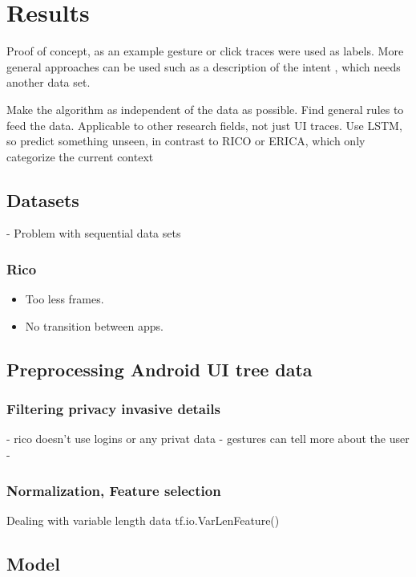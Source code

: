 \chapter{Results}

Proof of concept, as an example gesture or click traces were used as labels.
More general approaches can be used such as a description of the intent \cite{screen2words}, which needs another data set.

Make the algorithm as independent of the data as possible.
Find general rules to feed the data.
Applicable to other research fields, not just UI traces.
Use LSTM, so predict something unseen, in contrast to RICO or ERICA, which only categorize the current context

\section{Datasets}

- Problem with sequential data sets

\subsection{Rico}

\begin{itemize}
  \item Too less frames.
  \item No transition between apps.
\end{itemize}

\section{Preprocessing Android UI tree data}
\subsection{Filtering privacy invasive details}

- rico doesn't use logins or any privat data
- gestures can tell more about the user
-


\subsection{Normalization, Feature selection}

Dealing with variable length data tf.io.VarLenFeature()

\section{Model}

